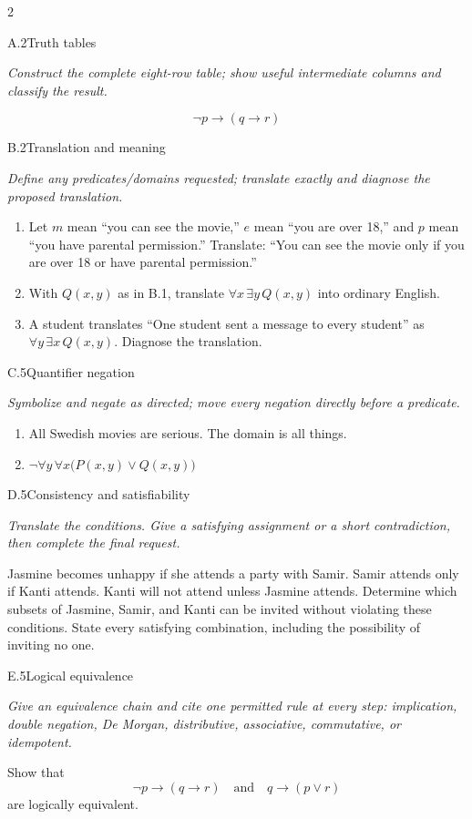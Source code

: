 \documentclass[9pt]{extarticle}
\begin{document}
\CoreWorkArea
\FormBreak
{}
\begin{multicols}{2}
\begin{CoreProblem}{A.2}{Truth tables}
{\scriptsize\textit{Construct the complete eight-row table; show useful intermediate columns and classify the result.}\par}
\[
  \neg p\to(q\to r)
\]
\end{CoreProblem}
\begin{CoreProblem}{B.2}{Translation and meaning}
{\scriptsize\textit{Define any predicates/domains requested; translate exactly and diagnose the proposed translation.}\par}
\begin{enumerate}[label=(\alph*)]
  \item Let $m$ mean ``you can see the movie,'' $e$ mean ``you are over 18,''
        and $p$ mean ``you have parental permission.'' Translate: ``You can
        see the movie only if you are over 18 or have parental permission.''
  \item With $Q(x,y)$ as in B.1, translate $\forall x\,\exists y\,Q(x,y)$
        into ordinary English.
  \item A student translates ``One student sent a message to every student''
        as $\forall y\,\exists x\,Q(x,y)$. Diagnose the translation.
\end{enumerate}
\end{CoreProblem}
\begin{CoreProblem}{C.5}{Quantifier negation}
{\scriptsize\textit{Symbolize and negate as directed; move every negation directly before a predicate.}\par}
\begin{enumerate}[label=(\alph*)]
  \item All Swedish movies are serious. The domain is all things.
  \item $\neg\forall y\,\forall x\bigl(P(x,y)\lor Q(x,y)\bigr)$
\end{enumerate}
\end{CoreProblem}
\columnbreak
\begin{CoreProblem}{D.5}{Consistency and satisfiability}
{\scriptsize\textit{Translate the conditions. Give a satisfying assignment or a short contradiction, then complete the final request.}\par}
Jasmine becomes unhappy if she attends a party with Samir. Samir attends only
if Kanti attends. Kanti will not attend unless Jasmine attends. Determine which
subsets of Jasmine, Samir, and Kanti can be invited without violating these
conditions. State every satisfying combination, including the possibility of
inviting no one.
\end{CoreProblem}
\begin{CoreProblem}{E.5}{Logical equivalence}
{\scriptsize\textit{Give an equivalence chain and cite one permitted rule at every step: implication, double negation, De Morgan, distributive, associative, commutative, or idempotent.}\par}
Show that
\[
  \neg p\to(q\to r)
  \quad\text{and}\quad
  q\to(p\lor r)
\]
are logically equivalent.
\end{CoreProblem}
\end{multicols}
\end{document}
